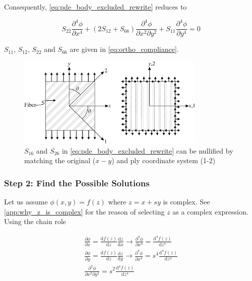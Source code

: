 \documentclass{article}
\begin{document}
Consequently, \cref{eq:pde_body_excluded_rewrite} reduces to

\begin{equation}
    S_{22} \frac{\partial^4 \phi}{\partial x^4} + (2 S_{12} + S_{66}) \frac{\partial^4 \phi}{\partial x^2 \partial y^2} + S_{11} \frac{\partial^4 \phi}{\partial y^4} = 0
    \label{eq:pde_to_solve}
\end{equation}

$S_{11}$, $S_{12}$, $S_{22}$ and $S_{66}$ are given in \cref{eq:ortho_compliance}.

\begin{figure}[H]
    \centering
    \includegraphics[width = 0.8\textwidth ]{figures/nullify.pdf}
    \caption{$S_{16}$ and $S_{26}$ in \cref{eq:pde_body_excluded_rewrite} can be nullified by matching the original ($x-y$) and ply coordinate system (1-2) \cite{Koussios2015}}
    \label{fig:nullify}
\end{figure}

\subsubsection{Step 2: Find the Possible Solutions}
Let us assume $\phi(x, y) = f(z)$ where $z = x + sy$ is complex. See \cref{app:why_z_is_complex} for the reason of selecting $z$ as a complex expression. Using the chain role

\begin{gather*}
    \frac{\partial \phi}{\partial x} = \frac{\mathrm{d} f(z)}{\mathrm{d} z} \frac{\mathrm{d} z}{\mathrm{d} x} \xrightarrow{} \frac{\partial^4 \phi}{\partial x^4} = \frac{\mathrm{d}^4 f(z)}{\mathrm{d} z^4} \\
    \frac{\partial \phi}{\partial y} = \frac{\mathrm{d} f(z)}{\mathrm{d} z} \frac{\mathrm{d} z}{\mathrm{d} y} \xrightarrow{} \frac{\partial^4 \phi}{\partial x^4} = s^4 \frac{\mathrm{d}^4 f(z)}{\mathrm{d} z^4} \\
    \frac{\partial^2 \phi}{\partial x^2 \partial y^2} = s^2 \frac{\mathrm{d}^4 f(z)}{\mathrm{d} z^4}
\end{gather*}
\end{document}
